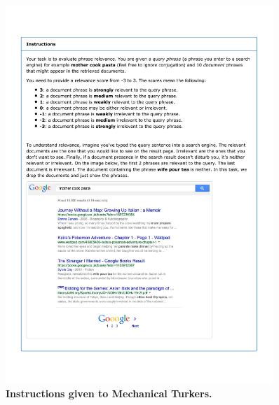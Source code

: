 \begin{figure}
\centering
\includegraphics[width=0.9\textwidth]{figures/instructions}

\caption{\textbf{Instructions given to Mechanical Turkers.}}

\label{fig:instructions}
\end{figure}

